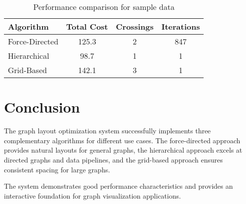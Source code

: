 \documentclass[11pt]{article}
\begin{document}
\begin{table}[h]
\centering
\begin{tabular}{|l|c|c|c|}
\hline
Algorithm & Total Cost & Crossings & Iterations \\
\hline
Force-Directed & 125.3 & 2 & 847 \\
Hierarchical & 98.7 & 1 & 1 \\
Grid-Based & 142.1 & 3 & 1 \\
\hline
\end{tabular}
\caption{Performance comparison for sample data}
\end{table}

\section{Conclusion}

The graph layout optimization system successfully implements three complementary algorithms for different use cases. The force-directed approach provides natural layouts for general graphs, the hierarchical approach excels at directed graphs and data pipelines, and the grid-based approach ensures consistent spacing for large graphs.

The system demonstrates good performance characteristics and provides an interactive foundation for graph visualization applications.
\end{document}
